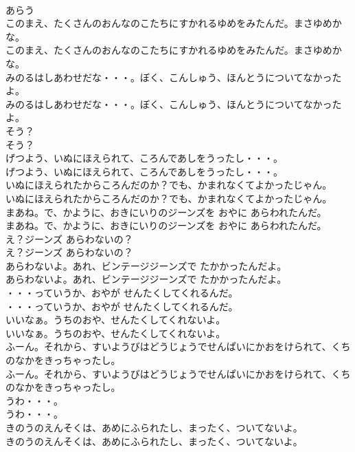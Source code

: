 \documentclass[8pt]{extreport}
\begin{document}
\begin{CJK}{UTF8}{min}
\\	あらう
\\	このまえ、たくさんのおんなのこたちにすかれるゆめをみたんだ。まさゆめかな。	
\\	このまえ、たくさんのおんなのこたちにすかれるゆめをみたんだ。まさゆめかな。 
\\	みのるはしあわせだな・・・。ぼく、こんしゅう、ほんとうについてなかったよ。	
\\	みのるはしあわせだな・・・。ぼく、こんしゅう、ほんとうについてなかったよ。 
\\	そう？	
\\	そう？ 
\\	げつよう、いぬにほえられて、ころんであしをうったし・・・。	
\\	げつよう、いぬにほえられて、ころんであしをうったし・・・。 
\\	いぬにほえられたからころんだのか？でも、かまれなくてよかったじゃん。	
\\	いぬにほえられたからころんだのか？でも、かまれなくてよかったじゃん。 
\\	まあね。で、かように、おきにいりのジーンズを おやに あらわれたんだ。	
\\	まあね。で、かように、おきにいりのジーンズを おやに あらわれたんだ。 
\\	え？ジーンズ あらわないの？	
\\	え？ジーンズ あらわないの？ 
\\	あらわないよ。あれ、ビンテージジーンズで たかかったんだよ。	
\\	あらわないよ。あれ、ビンテージジーンズで たかかったんだよ。 
\\	・・・っていうか、おやが せんたくしてくれるんだ。	
\\	・・・っていうか、おやが せんたくしてくれるんだ。 
\\	いいなぁ。うちのおや、せんたくしてくれないよ。	
\\	いいなぁ。うちのおや、せんたくしてくれないよ。 
\\	ふーん。それから、すいようびはどうじょうでせんぱいにかおをけられて、くちのなかをきっちゃったし。	
\\	ふーん。それから、すいようびはどうじょうでせんぱいにかおをけられて、くちのなかをきっちゃったし。 
\\	うわ・・・。	
\\	うわ・・・。 
\\	きのうのえんそくは、あめにふられたし、まったく、ついてないよ。	
\\	きのうのえんそくは、あめにふられたし、まったく、ついてないよ。 

\end{CJK}
\end{document}
